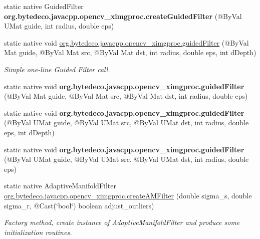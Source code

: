 \begin{DoxyCompactItemize}
static native Guided\+Filter {\bfseries org.\+bytedeco.\+javacpp.\+opencv\+\_\+ximgproc.\+create\+Guided\+Filter} (@By\+Val U\+Mat guide, int radius, double eps)
\item 
static native void \hyperlink{group__ximgproc__filters_ga7a63d78fbc962c2c9df0f525ae8083ff}{org.\+bytedeco.\+javacpp.\+opencv\+\_\+ximgproc.\+guided\+Filter} (@By\+Val Mat guide, @By\+Val Mat src, @By\+Val Mat dst, int radius, double eps, int d\+Depth)
\begin{DoxyCompactList}\small\item\em Simple one-\/line Guided Filter call. \end{DoxyCompactList}\item 
\mbox{\label{group__ximgproc__filters_gae40989fa1c61a1296faeee0ae9c6b841}} 
static native void {\bfseries org.\+bytedeco.\+javacpp.\+opencv\+\_\+ximgproc.\+guided\+Filter} (@By\+Val Mat guide, @By\+Val Mat src, @By\+Val Mat dst, int radius, double eps)
\item 
\mbox{\label{group__ximgproc__filters_ga34b22f0be0581e7bcf6f90374954a3d8}} 
static native void {\bfseries org.\+bytedeco.\+javacpp.\+opencv\+\_\+ximgproc.\+guided\+Filter} (@By\+Val U\+Mat guide, @By\+Val U\+Mat src, @By\+Val U\+Mat dst, int radius, double eps, int d\+Depth)
\item 
\mbox{\label{group__ximgproc__filters_ga3679d36e0b1e7681ba491db15a07ab68}} 
static native void {\bfseries org.\+bytedeco.\+javacpp.\+opencv\+\_\+ximgproc.\+guided\+Filter} (@By\+Val U\+Mat guide, @By\+Val U\+Mat src, @By\+Val U\+Mat dst, int radius, double eps)
\item 
static native Adaptive\+Manifold\+Filter \hyperlink{group__ximgproc__filters_ga0b203de6ac4064c7dac99b1d5647b13d}{org.\+bytedeco.\+javacpp.\+opencv\+\_\+ximgproc.\+create\+A\+M\+Filter} (double sigma\+\_\+s, double sigma\+\_\+r, @Cast(\char`\"{}bool\char`\"{}) boolean adjust\+\_\+outliers)
\begin{DoxyCompactList}\small\item\em Factory method, create instance of Adaptive\+Manifold\+Filter and produce some initialization routines. \end{DoxyCompactList}\item 
\mbox{\label{group__ximgproc__filters_ga6b19311cad1b562f4b4de0d94f6c2b46}} 

\end{DoxyCompactItemize}

